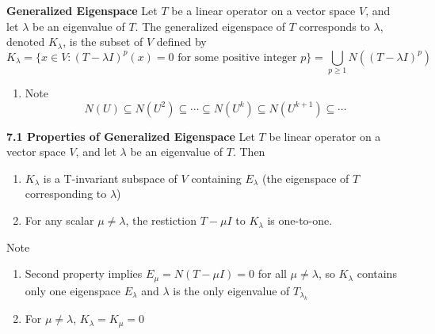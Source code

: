 \documentclass[11pt]{article}
\begin{document}
\begin{defn*}
    \textbf{Generalized Eigenspace} Let $T$ be a linear operator on a vector space $V$, and let $\lambda$ be an eigenvalue of $T$. The generalized eigenspace of $T$ corresponds to $\lambda$, denoted $K_{\lambda}$, is the subset of $V$ defined by 
    \[
        K_{\lambda} = 
        \{ x\in V: (T-\lambda I)^p(x) = 0 \text{ for some positive integer } p\} = 
        \bigcup_{p\geq 1} N((T-\lambda I)^p)
    \]
    \begin{enumerate}
        \item Note 
        \[
            N(U) \subseteq N(U^2) \subseteq \cdots \subseteq N(U^k) \subseteq N(U^{k+1}) \subseteq \cdots
        \]
    \end{enumerate}
\end{defn*}


\begin{theorem*}
    \textbf{7.1 Properties of Generalized Eigenspace} Let $T$ be linear operator on a vector space $V$, and let $\lambda$ be an eigenvalue of $T$. Then 
    \begin{enumerate}
        \item $K_{\lambda}$ is a T-invariant subspace of $V$ containing $E_{\lambda}$ (the eigenspace of $T$ corresponding to $\lambda$)
        \item For any scalar $\mu \neq \lambda$, the restiction $T - \mu I$ to $K_{\lambda}$ is one-to-one.
    \end{enumerate}
    Note
    \begin{enumerate}
        \item Second property implies $E_{\mu} = N(T-\mu I) = 0$ for all $\mu \neq \lambda$, so $K_{\lambda}$ contains only one eigenspace $E_{\lambda}$ and $\lambda$ is the only eigenvalue of $T_{\lambda_k}$
        \item For $\mu \neq \lambda$, $K_{\lambda} = K_{\mu} = 0$
    \end{enumerate}
\end{theorem*}
\end{document}
